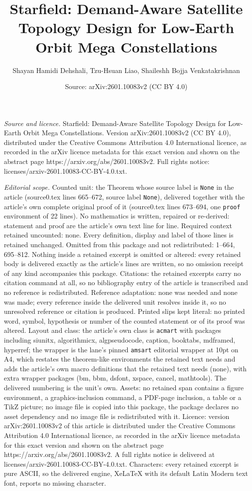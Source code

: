 \documentclass[10pt,a4paper]{amsart}
\title[Starfield: Demand-Aware Satellite Topology Design for Low-Ea]{Starfield: Demand-Aware Satellite Topology Design for Low-Earth Orbit Mega Constellations}
\author{Shayan Hamidi Dehshali, Tzu-Hsuan Liao, Shaileshh Bojja Venkatakrishnan}
\date{Source: arXiv:2601.10083v2 (CC BY 4.0)}
\begin{document}
\maketitle

\noindent\emph{Source and licence.} Starfield: Demand-Aware Satellite Topology Design for Low-Earth Orbit Mega Constellations. Version arXiv:2601.10083v2 (CC BY 4.0), distributed under the Creative Commons Attribution 4.0 International licence, as recorded in the arXiv licence metadata for this exact version and shown on the abstract page https://arxiv.org/abs/2601.10083v2. Full rights notice: licenses/arxiv-2601.10083-CC-BY-4.0.txt.\par\smallskip

\noindent\textit{Editorial scope.} Counted unit: the Theorem whose source label is \texttt{None} in the article (source0.tex lines 665--672, source label \texttt{None}), delivered together with the article's own complete original proof of it (source0.tex lines 673--694, one \texttt{proof} environment of 22 lines). No mathematics is written, repaired or re-derived: statement and proof are the article's own text line for line. Required context retained uncounted: none. Every definition, display and label of those lines is retained unchanged. Omitted from this package and not redistributed: 1--664, 695--812. Nothing inside a retained excerpt is omitted or altered: every retained body is delivered exactly as the article's lines are written, so no omission receipt of any kind accompanies this package. Citations: the retained excerpts carry no citation command at all, so no bibliography entry of the article is transcribed and no reference is redistributed. Reference adaptation: none was needed and none was made; every reference inside the delivered unit resolves inside it, so no unresolved reference or citation is produced. Printed slips kept literal: no printed word, symbol, hypothesis or number of the counted statement or of its proof was altered. Layout and class: the article's own class is \texttt{acmart} with packages including siunitx, algorithmicx, algpseudocode, caption, booktabs, mdframed, hyperref; the wrapper is the lane's pinned \texttt{amsart} editorial wrapper at 10pt on A4, which restates the theorem-like environments the retained text needs and adds the article's own macro definitions that the retained text needs (none), with extra wrapper packages (bm, bbm, dsfont, xspace, cancel, mathtools). The delivered numbering is the unit's own. Assets: no retained span contains a figure environment, a graphics-inclusion command, a PDF-page inclusion, a table or a TikZ picture; no image file is copied into this package, the package declares no asset dependency and no image file is redistributed with it. Licence: version arXiv:2601.10083v2 of this article is distributed under the Creative Commons Attribution 4.0 International licence, as recorded in the arXiv licence metadata for this exact version and shown on the abstract page https://arxiv.org/abs/2601.10083v2. A full rights notice is delivered at licenses/arxiv-2601.10083-CC-BY-4.0.txt. Characters: every retained excerpt is pure ASCII, so the delivered engine, XeLaTeX with its default Latin Modern text font, reports no missing character.
\end{document}
